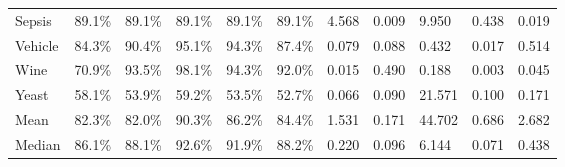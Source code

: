 \begin{tabular}{lllllllllll}
Sepsis              &       89.1\% &  89.1\% &  89.1\% &  89.1\% &  89.1\% &            4.568 &  0.009 &    9.950 &  0.438 &   0.019 \\
Vehicle             &       84.3\% &  90.4\% &  95.1\% &  94.3\% &  87.4\% &            0.079 &  0.088 &    0.432 &  0.017 &   0.514 \\
Wine                &       70.9\% &  93.5\% &  98.1\% &  94.3\% &  92.0\% &            0.015 &  0.490 &    0.188 &  0.003 &   0.045 \\
Yeast               &       58.1\% &  53.9\% &  59.2\% &  53.5\% &  52.7\% &            0.066 &  0.090 &   21.571 &  0.100 &   0.171 \\
Mean                &       82.3\% &  82.0\% &  90.3\% &  86.2\% &  84.4\% &            1.531 &  0.171 &   44.702 &  0.686 &   2.682 \\
Median              &       86.1\% &  88.1\% &  92.6\% &  91.9\% &  88.2\% &            0.220 &  0.096 &    6.144 &  0.071 &   0.438 \\
\bottomrule
\end{tabular}
